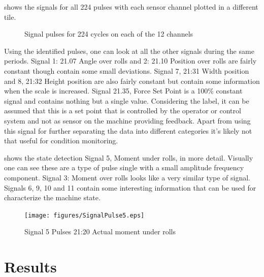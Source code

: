 \documentclass[]{article}
\begin{document}
 shows the signals for all 224 pulses with each sensor channel plotted in a different tile. 
\begin{figure}[H]
    \caption{Signal pulses for 224 cycles on each of the 12 channels}
    \label{fig:SignalPulses}
\end{figure}

Using the identified pulses, one can look at all the other signals during the same periods. Signal 1: 21.07 Angle over rolls and 2: 21.10 Position over rolls are fairly constant though contain some small deviations. Signal 7, 21:31 Width position and 8, 21:32 Height position are also fairly constant but contain some information when the scale is increased. Signal 21.35, Force Set Point is a 100\% constant signal and contains nothing but a single value. Considering the label, it can be assumed that this is a set point that is controlled by the operator or control system and not as sensor on the machine providing feedback. Apart from using this signal for further separating the data into different categories it's likely not that useful for condition monitoring.

 shows the state detection Signal 5, Moment under rolls, in more detail. Visually one can see these are a type of pulse single with a small amplitude frequency component. Signal 3: Moment over rolls looks like a very similar type of signal. Signals 6, 9, 10 and 11 contain some interesting information that can be used for characterize the machine state.

\begin{figure}[H]
    \centering
    \texttt{[image: figures/SignalPulse5.eps]}
    \caption{Signal 5 Pulses 21:20 Actual moment under rolls}
    \label{fig:SignalPulse5}
\end{figure}

\section{Results}
\end{document}
